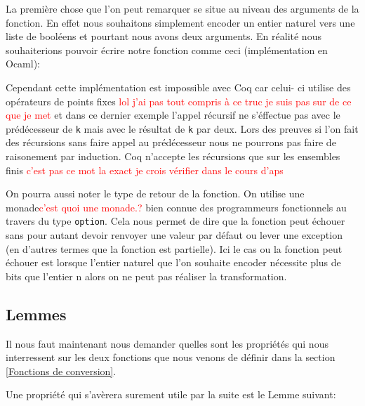 \documentclass {article}
\newcommand{\codefrom}[3]
           {}
\newcommand{\codefromOcaml}[3]
           {}
\theoremstyle{definition}
\theoremstyle{remark}
\newcommand{\todo}[1]{\textcolor{red}{#1}}
\newcommand{\fun}[1]{\lstinline!#1!}
\begin{document}
La première chose que l'on peut remarquer se situe au niveau des arguments de
la fonction. En effet nous souhaitons simplement encoder un entier naturel vers
une liste de booléens et pourtant nous avons deux arguments.
En réalité nous souhaiterions pouvoir écrire notre fonction comme ceci
(implémentation en Ocaml):
\codefromOcaml{rapport}{example}{nbit}

Cependant cette implémentation est impossible avec Coq car celui- ci utilise
des opérateurs de points fixes \todo{lol j'ai pas tout compris à ce truc je suis
  pas sur de ce que je met} et dans ce dernier exemple l'appel récursif ne s'éffectue
pas avec le prédécesseur de \fun{k}  mais avec le
résultat de \fun{k} par deux. Lors des preuves si l'on fait des récursions sans faire appel
au prédécesseur nous ne pourrons pas faire de raisonement par induction. Coq n'accepte les
récursions que sur les ensembles finis \todo{c'est pas ce mot la exact je crois vérifier dans le cours d'aps}



On pourra aussi noter le type de retour de la fonction.
On utilise une monade\todo{c'est quoi une monade.?} bien connue des programmeurs fonctionnels au travers du type
\fun{option}. Cela nous permet de
dire que la fonction peut échouer sans pour autant devoir renvoyer une valeur par
défaut ou lever une exception (en d'autres termes que la fonction est partielle). Ici le cas ou la fonction peut échouer est lorsque
l'entier naturel que l'on souhaite encoder nécessite plus de bits que l'entier n alors
on ne peut pas réaliser la transformation.





\subsection{Lemmes}

Il nous faut maintenant nous demander quelles sont les propriétés qui nous interressent sur
les deux fonctions que nous venons de définir dans la section \ref{Fonctions de conversion}.

Une propriété qui s'avèrera surement utile par la suite est le Lemme suivant:

\codefrom{src}{binary}{size_n_bit}
\end{document}
